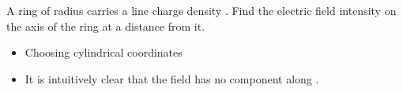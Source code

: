 \begin{ELexample}{}

A ring of radius  carries a line charge density \ELim{\rho_\ell}. Find the electric field intensity on the axis of the ring at a distance  from it.


\begin{ELsolution}


\begin{itemize}
\tightlist
\item
  Choosing cylindrical coordinates
\end{itemize}


\begin{itemize}
\tightlist
\item
  It is intuitively clear that the field has no component along .
\end{itemize}


\end{ELsolution}

\end{ELexample}


